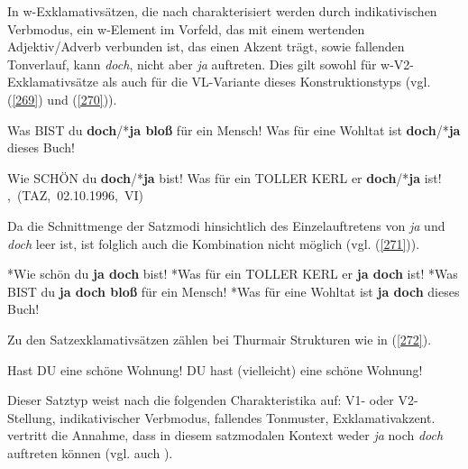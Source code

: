 \noindent
In w-Exklamativsätzen,  die nach \citet[45]{Thurmair1989} charakterisiert werden durch indikativischen Verbmodus, ein w-Element im Vorfeld, das mit einem wertenden Adjektiv/Adverb verbunden ist, das einen Akzent trägt, sowie fallenden Tonverlauf, kann \textit{doch}, nicht aber \textit{ja} auftreten. Dies gilt sowohl für w-V2-Exklamativsätze als auch für die VL-Variante dieses Konstruktionstyps (vgl. (\ref{269}) und (\ref{270})).

\begin{exe}
	\ex\label{269} 
		\begin{xlist}	
			\ex\label{269a} Was BIST du \textbf{doch}/*\textbf{ja bloß} für ein Mensch!
			\ex\label{269b} Was für eine Wohltat ist \textbf{doch}/*\textbf{ja} dieses Buch!
		\end{xlist}
\end{exe}

\begin{exe}
	\ex\label{270} 
		\begin{xlist}	
			\ex\label{270a} Wie SCHÖN du \textbf{doch}/*\textbf{ja} bist!	
			\hfill\hbox {\citet[218-219]{Rinas2006}}
			\ex\label{270b} Was für ein TOLLER KERL er \textbf{doch}/*\textbf{ja} ist!
			\newline
			\hbox{}\hfill\hbox {\citet[37]{Kwon2005}, (TAZ, 02.10.1996, VI)}
		\end{xlist}
\end{exe}
Da die Schnittmenge der Satzmodi hinsichtlich des Einzelauftretens von \textit{ja} und \textit{doch} leer ist, ist folglich auch die Kombination nicht möglich (vgl. (\ref{271})).

\begin{exe}
	\ex\label{271} 
		\begin{xlist}	
			\ex\label{271a} *Wie schön du \textbf{ja doch} bist!	
			\ex\label{271b} *Was für ein TOLLER KERL er \textbf{ja doch} ist!
			\ex\label{271c} *Was BIST du \textbf{ja doch bloß} für ein Mensch!	
			\ex\label{271d} *Was für eine Wohltat ist \textbf{ja doch} dieses Buch!
		\end{xlist}
\end{exe}
Zu den Satzexklamativsätzen  zählen bei Thurmair Strukturen wie in (\ref{272}).

\begin{exe}
	\ex\label{272} 
		\begin{xlist}	
			\ex\label{272a} Hast DU eine schöne Wohnung!	
			\ex\label{271b} DU hast (vielleicht) eine schöne Wohnung!
		\end{xlist}
\end{exe}
Dieser Satztyp weist nach \citet[45]{Thurmair1989} die folgenden Charakteristika auf: V1- oder V2-Stellung, indikativischer Verbmodus, fallendes Tonmuster, Exklamativakzent. \citet[49]{Thurmair1989} vertritt die Annahme, dass in diesem satzmodalen Kontext weder \textit{ja} noch \textit{doch} auftreten können (vgl. auch \citealt[40]{Altmann1987}). 

